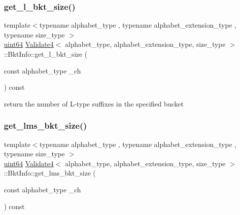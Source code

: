 \mbox{\label{struct_validate4_1_1_bkt_info_ae06c1968c2288d191f59214a0f10e7d7}} 
\subsubsection{\texorpdfstring{get\+\_\+l\+\_\+bkt\+\_\+size()}{get\_l\_bkt\_size()}}
{\footnotesize\ttfamily template$<$typename alphabet\+\_\+type , typename alphabet\+\_\+extension\+\_\+type , typename size\+\_\+type $>$ \\
\hyperlink{types_8h_a60e8696a4678cd348e991a1f172e53f7}{uint64} \hyperlink{class_validate4}{Validate4}$<$ alphabet\+\_\+type, alphabet\+\_\+extension\+\_\+type, size\+\_\+type $>$\+::Bkt\+Info\+::get\+\_\+l\+\_\+bkt\+\_\+size (\begin{DoxyParamCaption}\item[{const alphabet\+\_\+type}]{\+\_\+ch }\end{DoxyParamCaption}) const\hspace{0.3cm}{\ttfamily [inline]}}



return the number of L-\/type suffixes in the specified bucket 

\mbox{\label{struct_validate4_1_1_bkt_info_a0f7a940f516eefaae031ecd75c0fc971}} 
\subsubsection{\texorpdfstring{get\+\_\+lms\+\_\+bkt\+\_\+size()}{get\_lms\_bkt\_size()}}
{\footnotesize\ttfamily template$<$typename alphabet\+\_\+type , typename alphabet\+\_\+extension\+\_\+type , typename size\+\_\+type $>$ \\
\hyperlink{types_8h_a60e8696a4678cd348e991a1f172e53f7}{uint64} \hyperlink{class_validate4}{Validate4}$<$ alphabet\+\_\+type, alphabet\+\_\+extension\+\_\+type, size\+\_\+type $>$\+::Bkt\+Info\+::get\+\_\+lms\+\_\+bkt\+\_\+size (\begin{DoxyParamCaption}\item[{const alphabet\+\_\+type}]{\+\_\+ch }\end{DoxyParamCaption}) const\hspace{0.3cm}{\ttfamily [inline]}}



